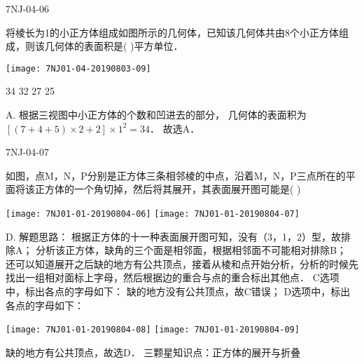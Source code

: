 \begin{defproblem}{7NJ-04-06}%
\begin{onlyproblem}%
将棱长为1的小正方体组成如图所示的几何体，已知该几何体共由8个小正方体组成，则该几何体的表面积是(    )平方单位． 
\begin{center}
\texttt{[image: 7NJ01-04-20190803-09]}
\end{center}

\xx
{34}
{32}
{27}
{25}

\end{onlyproblem}%
\begin{onlysolution}%
\begin{solution}%
A. 根据三视图中小正方体的个数和凹进去的部分， 几何体的表面积为$[(7+4+5) \times 2+2] \times 1^{2}=34$． 故选A． 
\end{solution}%
\end{onlysolution}%
\end{defproblem}





\begin{defproblem}{7NJ-04-07}%
\begin{onlyproblem}%
如图，点M，N，P分别是正方体三条相邻棱的中点，沿着M，N，P三点所在的平面将该正方体的一个角切掉，然后将其展开，其表面展开图可能是(    )  
\begin{center}
\texttt{[image: 7NJ01-01-20190804-06]}
\texttt{[image: 7NJ01-01-20190804-07]}
\end{center}


\end{onlyproblem}%
\begin{onlysolution}%
\begin{solution}%
D.
解题思路： 根据正方体的十一种表面展开图可知，没有（3，1，2）型，故排除A； 分析该正方体，缺角的三个面是相邻面，根据相邻面不可能相对排除B； 还可以知道展开之后缺的地方有公共顶点，接着从棱和点开始分析，分析的时候先找出一组相对面标上字母，然后根据边的重合与点的重合标出其他点． C选项中，标出各点的字母如下：   缺的地方没有公共顶点，故C错误； D选项中，标出各点的字母如下：
\begin{center}
\texttt{[image: 7NJ01-01-20190804-08]}
\texttt{[image: 7NJ01-01-20190804-09]}
\end{center}
 缺的地方有公共顶点，故选D． 
三颗星知识点：正方体的展开与折叠  
\end{solution}%
\end{onlysolution}%
\end{defproblem}






